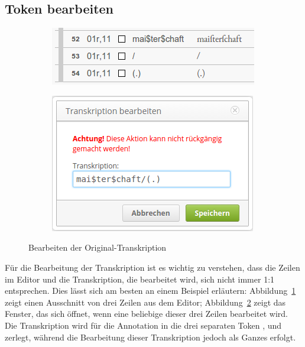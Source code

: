 \documentclass[11pt,a4paper,parskip=half]{scrartcl}
\begin{document}
\subsection{Token bearbeiten}
\label{sec:trans-edit}

\begin{figure}
  \centering
  \begin{subfigure}[b]{0.4\textwidth}
    \centering
    \includegraphics[width=\textwidth]{img/trans-bsp1.png}
    \caption{}
    \label{fig:trans-bsp1}
  \end{subfigure}
  \hfill
  \begin{subfigure}[b]{0.4\textwidth}
    \centering
    \includegraphics[width=\textwidth]{img/1.2/trans-edit1.png}
    \caption{}
    \label{fig:trans-edit1}
  \end{subfigure}
  \caption{Bearbeiten der Original-Transkription}
  \label{fig:trans-edit}
\end{figure}

Für die Bearbeitung der Transkription ist es wichtig zu verstehen,
dass die Zeilen im Editor und die Transkription, die bearbeitet wird,
sich nicht immer 1:1 entsprechen.  Dies lässt sich am besten an einem
Beispiel erläutern: Abbildung~\ref{fig:trans-bsp1} zeigt einen
Ausschnitt von drei Zeilen aus dem Editor;
Abbildung~\ref{fig:trans-edit1} zeigt das Fenster, das sich öffnet,
wenn eine beliebige dieser drei Zeilen bearbeitet wird.  Die
Transkription  wird für die Annotation in
die drei separaten Token , \trans{/} und
 zerlegt, während die Bearbeitung dieser Transkription
jedoch als Ganzes erfolgt.
\end{document}
